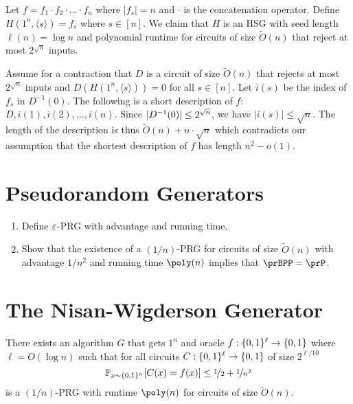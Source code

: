 \begin{proofsk}
    Let $f = f_1 \cdot f_2 \cdot \ldots \cdot f_n$ where $|f_s| = n$ and $\cdot$ is the 
    concatenation operator.
    Define $H(1^n, \langle s \rangle) = f_s$ where $s \in [n]$.
    We claim that $H$ is an HSG with seed length $\ell(n) = \log{n}$ and polynomial 
    runtime for circuits of size $\widetilde{O}(n)$ that reject at most $2^{\sqrt{n}}$ 
    inputs.

    Assume for a contraction that $D$ is a circuit of size $\widetilde{O}(n)$ that 
    rejects at most $2^{\sqrt{n}}$ inputs and $D(H(1^n, \langle s \rangle)) = 0$ for 
    all $s \in [n]$.
    Let $i(s)$ be the index of $f_s$ in $D^{-1}(0)$.
    The following is a short description of $f$: $D, i(1), i(2), \dots, i(n)$.
    Since $\lvert D^{-1}(0)\rvert \leq 2^{\sqrt{n}}$, we have $|i(s)| \leq \sqrt{n}$.
    The length of the description is thus $\widetilde{O}(n) + n \cdot \sqrt{n}$ which 
    contradicts our assumption that the shortest description of $f$ has length $n^2 - 
    o(1)$.

\end{proofsk}

\section{Pseudorandom Generators}

\begin{enumerate}
  \item Define $\varepsilon$-PRG with advantage and running time.
  \item Show that the existence of a $(1/n)$-PRG for circuits of size $\widetilde{O}(n)$ with advantage $1/n^2$ and running time $\poly(n)$ implies that $\prBPP = \prP$.
\end{enumerate}

\section{The Nisan-Wigderson Generator}

\begin{theorem}
  There exists an algorithm $G$ that gets $1^n$ and oracle $f : \{0, 1\}^\ell \to \{0, 1\}$ where $\ell = O(\log{n})$ such that for all circuits $C : \{0, 1\}^\ell \to \{0, 1\}$ of size $2^{\ell/10}$ \[
    \mathbb{P}_{x \sim \{0, 1\}^n}[C(x) = f(x)] \le \nicefrac{1}{2} + \nicefrac{1}{n^2}
  \]
  is a $(1/n)$-PRG with runtime $\poly(n)$ for circuits of size $\widetilde{O}(n)$.
\end{theorem}

